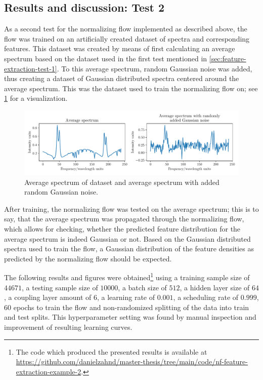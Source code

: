 \documentclass[a4paper,12pt]{report}
\begin{document}
\subsection{Results and discussion: Test 2}
As a second test for the normalizing flow implemented as described above, the flow was trained on an artificially created dataset of spectra and corresponding features. This dataset was created by means of first calculating an average spectrum based on the dataset used in the first test mentioned in \cref{sec:feature-extraction-test-1}. To this average spectrum, random Gaussian noise was added, thus creating a dataset of Gaussian distributed spectra centered around the average spectrum. This was the dataset used to train the normalizing flow on; see \cref{fig:nf-feature-extraction-example-2-spectra} for a visualization. 
\begin{figure}[h]
\centering
\includegraphics[width=\textwidth]{figures/nf-feature-extraction-example-2-spectra.pdf}
\caption{Average spectrum of dataset and average spectrum with added random Gaussian noise.}
\label{fig:nf-feature-extraction-example-2-spectra}
\end{figure}
After training, the normalizing flow was tested on the average spectrum; this is to say, that the average spectrum was propagated through the normalizing flow, which allows for checking, whether the predicted feature distribution for the average spectrum is indeed Gaussian or not. Based on the Gaussian distributed spectra used to train the flow, a Gaussian distribution of the feature densities as predicted by the normalizing flow should be expected.

The following results and figures were obtained\footnote{The code which produced the presented results is available at \url{https://github.com/danielzahnd/master-thesis/tree/main/code/nf-feature-extraction-example-2}.} using a training sample size of $44671$, a testing sample size of $10000$, a batch size of $512$, a hidden layer size of $64$, a coupling layer amount of $6$, a learning rate of $0.001$, a scheduling rate of $0.999$, $60$ epochs to train the flow and non-randomized splitting of the data into train and test splits. This hyperparameter setting was found by manual inspection and improvement of resulting learning curves.
\end{document}
